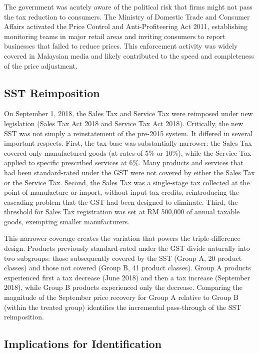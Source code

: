 \documentclass[12pt]{article}
\begin{document}
The government was acutely aware of the political risk that firms might not pass the tax reduction to consumers. The Ministry of Domestic Trade and Consumer Affairs activated the Price Control and Anti-Profiteering Act 2011, establishing monitoring teams in major retail areas and inviting consumers to report businesses that failed to reduce prices. This enforcement activity was widely covered in Malaysian media and likely contributed to the speed and completeness of the price adjustment.

\subsection{SST Reimposition}

On September 1, 2018, the Sales Tax and Service Tax were reimposed under new legislation (Sales Tax Act 2018 and Service Tax Act 2018). Critically, the new SST was not simply a reinstatement of the pre-2015 system. It differed in several important respects. First, the tax base was substantially narrower: the Sales Tax covered only manufactured goods (at rates of 5\% or 10\%), while the Service Tax applied to specific prescribed services at 6\%. Many products and services that had been standard-rated under the GST were not covered by either the Sales Tax or the Service Tax. Second, the Sales Tax was a single-stage tax collected at the point of manufacture or import, without input tax credits, reintroducing the cascading problem that the GST had been designed to eliminate. Third, the threshold for Sales Tax registration was set at RM 500,000 of annual taxable goods, exempting smaller manufacturers.

This narrower coverage creates the variation that powers the triple-difference design. Products previously standard-rated under the GST divide naturally into two subgroups: those subsequently covered by the SST (Group A, 20 product classes) and those not covered (Group B, 41 product classes). Group A products experienced first a tax decrease (June 2018) and then a tax increase (September 2018), while Group B products experienced only the decrease. Comparing the magnitude of the September price recovery for Group A relative to Group B (within the treated group) identifies the incremental pass-through of the SST reimposition.

\subsection{Implications for Identification}
\end{document}
